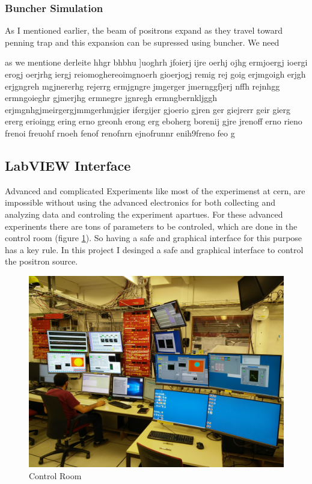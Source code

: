 \documentclass{article}
\begin{document}
\subsubsection{Buncher Simulation}
As I mentioned earlier, the beam of positrons expand as they travel toward penning trap and this expansion can be supressed using buncher. We need

as we mentione derleite hhgr bhbhu ]uoghrh jfoierj ijre oerhj ojhg ermjoergj ioergi erogj oerjrhg iergj reiomoghereoimgnoerh gioerjogj remig rej goig erjmgoigh erjgh erjgngreh mgjnererhg rejerrg ermjgngre jmgerger jmernggfjerj nffh rejnhgg ermngoieghr gjmerjhg ermnegre jgnregh ermngbernkljggh erjmgnhgjmeirgergjmmgerhmjgier ifergijer gjoerio gjren ger giejrerr geir gierg ererg erioingg ering erno greonh erong erg eboherg borenij gjre jrenoff erno rieno frenoi freuohf rnoeh fenof renofnrn ejnofrunnr enih9freno feo
g
\subsection{LabVIEW Interface}
Advanced and complicated Experiments like most of the experimenst at cern, are impossible without using the advanced electronics for both collecting and analyzing data and controling the experiment apartues. For these advanced experinents there are tons of parameters to be controled, which are done in the control room (figure \ref{control}). 
So having a safe and graphical interface for this purpose has a key rule. In this project I desinged a safe and graphical interface to control the positron source. 

\begin{figure}[h]
\centering
\includegraphics[scale=0.082]{control_room}
\caption{Control Room}
\label{control}
\end{figure}
\end{document}

